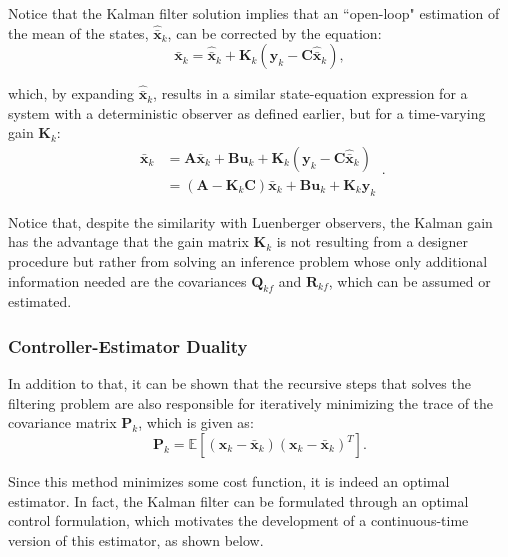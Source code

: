 \documentclass[a4paper,11pt]{book}
\numberwithin{figure}{chapter}
\numberwithin{equation}{chapter}
\numberwithin{table}{chapter}
\theoremstyle{definition}
\begin{document}
Notice that the Kalman filter solution implies that an ``open-loop" estimation of the mean of the states, $\hat{\bar{\bm{x}}}_k$, can be corrected by the equation:
\begin{equation}
    \bar{\bm{x}}_k = \hat{\bar{\bm{x}}}_k + \bm{K}_k (\bm{y}_k - \bm{C} \hat{\bar{\bm{x}}}_k)
,\end{equation}

\noindent which, by expanding $\hat{\bar{\bm{x}}}_k$, results in a similar state-equation expression for a system with a deterministic observer as defined earlier, but for a time-varying gain $\bm{K}_k$:
\begin{equation}
\begin{split}
    \bar{\bm{x}}_k &= \bm{A} \bar{\bm{x}}_k + \bm{B} \bm{u}_k + \bm{K}_k (\bm{y}_k - \bm{C} \hat{\bar{\bm{x}}}_k) \\
    &= \left( \bm{A} - \bm{K}_k \bm{C} \right) \bar{\bm{x}}_k + \bm{B} \bm{u}_k + \bm{K}_k \bm{y}_k
\end{split}
.\end{equation}

Notice that, despite the similarity with Luenberger observers, the Kalman gain has the advantage that the gain matrix $\bm{K}_k$ is not resulting from a designer procedure but rather from solving an inference problem whose only additional information needed are the covariances $\bm{Q}_{kf}$ and $\bm{R}_{kf}$, which can be assumed or estimated. 

\subsubsection{Controller-Estimator Duality}

In addition to that, it can be shown that the recursive steps that solves the filtering problem are also responsible for iteratively minimizing the trace of the covariance matrix $\bm{P}_k$, which is given as:
\begin{equation}
    \bm{P}_k = \mathbb{E}\left[ (\bm{x}_k - \bar{\bm{x}}_k)(\bm{x}_k - \bar{\bm{x}}_k)^T \right]
.\end{equation}

\noindent Since this method minimizes some cost function, it is indeed an optimal estimator. In fact, the Kalman filter can be formulated through an optimal control formulation, which motivates the development of a continuous-time version of this estimator, as shown below.
\end{document}
